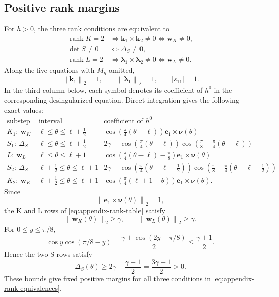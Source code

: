 \documentclass[10pt,a4paper]{amsart}
\numberwithin{equation}{section}
\newcommand{\norm}[1]{\left\lVert #1\right\rVert}
\begin{document}
\subsection{Positive rank margins}
\label{app:positive-rank-margins}

For $h>0$, the three rank conditions are equivalent to
\begin{equation}\label{eq:appendix-rank-equivalences}
\begin{aligned}
 \operatorname{rank}K=2
 &\iff \boldsymbol k_1\times\boldsymbol k_2\ne0
 \iff \boldsymbol w_K\ne0,\\
 \det S\ne0&\iff \Delta_S\ne0,\\
 \operatorname{rank}L=2
 &\iff \boldsymbol\lambda_1\times\boldsymbol\lambda_2\ne0
 \iff \boldsymbol w_L\ne0.
\end{aligned}
\end{equation}
Along the five equations with $M_\eta$ omitted,
\[
 \norm{\boldsymbol k_1}_2=1,
 \qquad \norm{\boldsymbol\lambda_1}_2=1,
 \qquad |s_{11}|=1.
\]
In the third column below, each symbol denotes its coefficient of
$h^0$ in the corresponding desingularized equation.  Direct
integration gives the following exact values:
{\small
\setlength{\arraycolsep}{3pt}
\begin{equation}\label{eq:appendix-rank-table}
\begin{array}{c|c|c}
\text{substep and quantity}&\text{interval}&\text{coefficient of $h^0$}\\
\hline
K_1:\ \boldsymbol w_K&\ell\le\theta\le\ell+\tfrac12&
 \cos\!\left(\frac\pi4(\theta-\ell)\right)
  \boldsymbol e_1\times\boldsymbol\nu(\theta)\\[2mm]
S_1:\ \Delta_S&\ell\le\theta\le\ell+\tfrac12&
 2\gamma-\cos\!\left(\frac\pi4(\theta-\ell)\right)
 \cos\!\left(\frac\pi8-\frac\pi4(\theta-\ell)\right)\\[2mm]
L:\ \boldsymbol w_L&\ell\le\theta\le\ell+1&
 \cos\!\left(\frac\pi4(\theta-\ell)-\frac\pi8\right)
  \boldsymbol e_1\times\boldsymbol\nu(\theta)\\[2mm]
S_2:\ \Delta_S&\ell+\tfrac12\le\theta\le\ell+1&
 2\gamma-\cos\!\left(\frac\pi4(\theta-\ell-\tfrac12)\right)
 \cos\!\left(\frac\pi8-\frac\pi4(\theta-\ell-\tfrac12)\right)\\[2mm]
K_2:\ \boldsymbol w_K&\ell+\tfrac12\le\theta\le\ell+1&
 \cos\!\left(\frac\pi4(\ell+1-\theta)\right)
  \boldsymbol e_1\times\boldsymbol\nu(\theta).
\end{array}
\end{equation}
}
Since
\[
 \norm{\boldsymbol e_1\times\boldsymbol\nu(\theta)}_2=1,
\]
the K and L rows of \eqref{eq:appendix-rank-table} satisfy
\[
 \norm{\boldsymbol w_K(\theta)}_2
 \ge\gamma,
 \qquad
 \norm{\boldsymbol w_L(\theta)}_2
 \ge\gamma.
\]
For $0\le y\le\pi/8$,
\[
 \cos y\cos(\pi/8-y)
 =\frac{\gamma+\cos(2y-\pi/8)}2
 \le\frac{\gamma+1}{2}.
\]
Hence the two S rows satisfy
\[
 \Delta_S(\theta)
 \ge 2\gamma-\frac{\gamma+1}{2}
 =\frac{3\gamma-1}{2}>0.
\]
These bounds give fixed positive margins for all three conditions in
\eqref{eq:appendix-rank-equivalences}.
\end{document}
